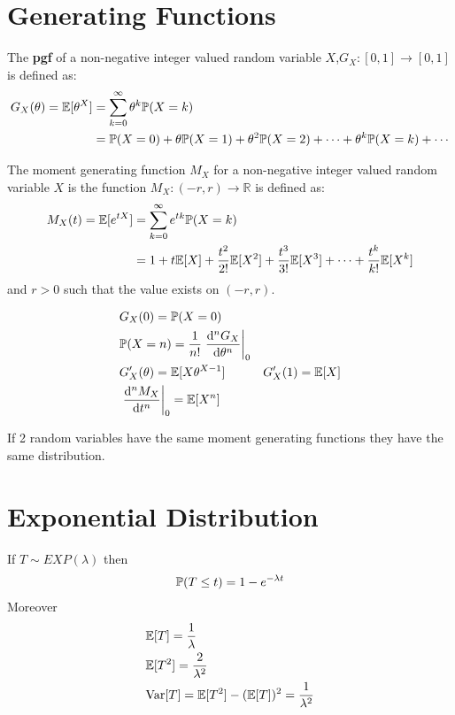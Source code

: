 \documentclass[12pt,a4paper]{article}
\begin{document}
\section{Generating Functions}
\begin{defn}
The \textbf{pgf} of a non-negative integer valued  random variable $X$,$G_X: [0,1] \to [0,1]$ is defined as:
\begin{align*}
G_X(\theta) = \E[\theta^X] &= \nsum{k=0}{\infty}\theta^k \P(X = k)\\
&= \P(X = 0) + \theta \P(X = 1) + \theta^2\P(X = 2) + \cdots + \theta^k\P(X = k) + \cdots
\end{align*} 
\end{defn}
\begin{defn}
The moment generating function $M_X$ for a non-negative integer valued  random variable $X$ is the function $M_X: (-r, r) \to \mathbb{R}$ is defined as:
\begin{align*}
M_X(t) = \E[e^{tX}] &= \nsum{k=0}{\infty}e^{tk}\P(X = k)\\
&= 1 + t\E[X] + \frac{t^2}{2!}\E[X^2] + \frac{t^3}{3!}\E[X^3] + \cdots + \frac{t^k}{k!}\E[X^k]
\end{align*}
and $r>0$ such that the value exists on $(-r,r)$.
\end{defn}

\begin{thm}
\begin{align*}
&G_X(0) = \P(X = 0)\\
&\P(X = n) = \frac{1}{n!}\left.\dv[n]{G_X}{\theta}\right\vert_0\\
&G'_X(\theta) = \E[X\theta^{X-1}] & G'_X(1) = \E[X]\\
&\left.\dv[n]{M_X}{t}\right\vert_0 = \E[X^n]
\end{align*}
\end{thm}

\begin{lemma}
If 2 random variables have the same moment generating functions they have the same distribution. 
\end{lemma}

\newpage
\section{Exponential Distribution}
\begin{defn}
If $T \sim EXP(\lambda)$ then 
\begin{align*}
\P(T\leq t) = 1-e^{-\lambda t}
\end{align*}
Moreover 
\begin{align*}
&\E[T] = \frac{1}{\lambda}\\
&\E[T^2] = \frac{2}{\lambda^2}\\
&\Var[T] = \E[T^2] - (\E[T])^2 = \frac{1}{\lambda^2}
\end{align*}
\end{defn}
\end{document}
